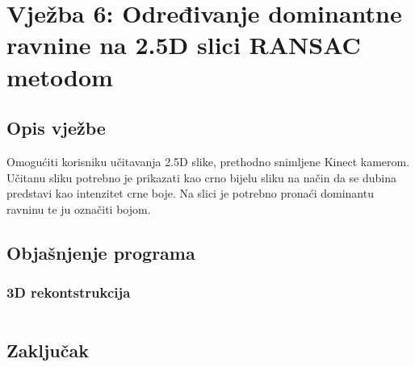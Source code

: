 \setcounter{figure}{0}
\setcounter{lstlisting}{0}
\section{Vježba 6: Određivanje dominantne ravnine na 2.5D slici RANSAC
metodom}

\subsection{Opis vježbe}
Omogućiti korisniku učitavanja 2.5D slike, prethodno snimljene Kinect
kamerom. Učitanu sliku potrebno je prikazati kao crno bijelu sliku na
način da se dubina predstavi kao intenzitet crne boje. Na slici je
potrebno pronaći dominantu ravninu te ju označiti bojom.
\\

\subsection{Objašnjenje programa}

\newpage
\subsubsection{3D rekontstrukcija}

\begin{lstlisting}[language=C,caption={Detekcija objekta na drugoj
    slici}]
\end{lstlisting}

\newpage
\subsection{Zaključak}
